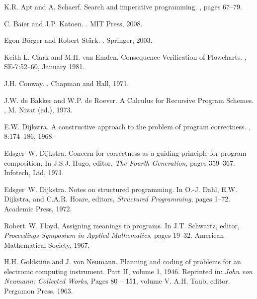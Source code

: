 \documentclass[preprint,11pt]{elsarticle}
\begin{document}
\begin{thebibliography}{10}

K.R. Apt and A. Schaerf.
\newblock Search and imperative programming.
,
pages 67--79.

C. Baier and J.P. Katoen.
.
\newblock MIT Press, 2008.

Egon B\"orger and Robert St\"ark.
.
\newblock Springer, 2003.

Keith L. Clark and M.H. van Emden.
\newblock Consequence Verification of Flowcharts.
,
SE-7:52--60, January 1981.

J.H. Conway.
.
\newblock Chapman and Hall, 1971.

J.W. de Bakker and W.P. de Roever.
\newblock A Calculus for Recursive Program Schemes.
,
M. Nivat (ed.), 1973.

E.W. Dijkstra.
\newblock A constructive approach
          to the problem of program correctness.
, 8:174--186, 1968.

Edsger~W. Dijkstra.
\newblock Concern for correctness as a guiding principle for program
  composition.
\newblock In J.S.J. Hugo, editor, {\em The Fourth Generation}, pages 359--367.
  Infotech, Ltd, 1971.

Edsger~W. Dijkstra.
\newblock Notes on structured programming.
\newblock In O.-J. Dahl, E.W. Dijkstra, and C.A.R. Hoare, editors, {\em
  Structured Programming}, pages 1--72. Academic Press, 1972.



Robert~W. Floyd.
\newblock Assigning meanings to programs.
\newblock In J.T. Schwartz, editor, {\em Proceedings Symposium
  in Applied Mathematics}, pages 19--32.
  American Mathematical Society, 1967.

H.H. Goldstine and J. von Neumann.
\newblock Planning and coding of problems
for an electronic computing instrument. Part II, volume 1, 1946.
\newblock Reprinted in: \emph{John von Neumann: Collected Works},
Pages 80 -- 151, volume V.
\newblock A.H. Taub, editor. Pergamon Press, 1963. 


\end{thebibliography}
\end{document}

